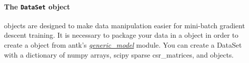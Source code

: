 \documentclass[letterpaper,10pt,english]{sphinxmanual}
\begin{document}
\paragraph{The \texttt{DataSet} object}
\label{loader_tutorial:the-dataset-object}
{\hyperref[loader:loader.DataSet]{\emph{}}} objects are designed to make data manipulation easier for mini-batch gradient descent training. It is necessary
to package your data in a {\hyperref[loader:loader.DataSet]{\emph{}}} object in order to create a {\hyperref[generic_model:generic_model.Model]{\emph{}}} object from antk's {\hyperref[generic_model::doc]{\emph{\emph{generic\_model}}}}
module. You can create a DataSet with a dictionary of numpy arrays, scipy sparse csr\_matrices, and {\hyperref[loader:loader.HotIndex]{\emph{}}} objects.
\begin{quote}


\end{quote}
\end{document}
